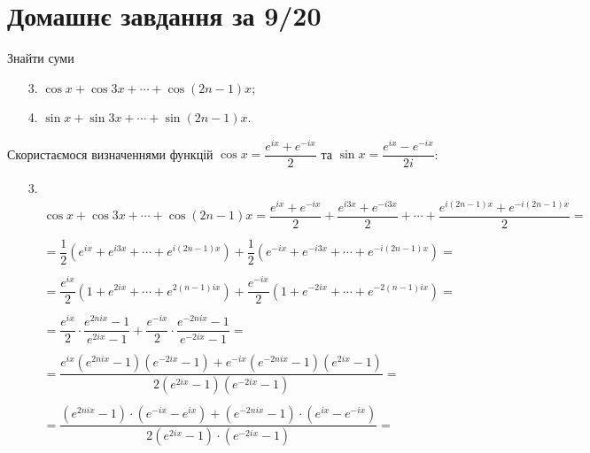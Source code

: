 \setcounter{section}{3}

\section{Домашнє завдання за 9/20}

\begin{problem}[Волковиський, 62]
    Знайти суми
    \begin{enumerate}
        \item[3.] $\cos x + \cos 3x + \cdots + \cos (2n - 1) x$;
        \item[4.] $\sin x + \sin 3x + \cdots + \sin (2n - 1) x$.
    \end{enumerate}
\end{problem}

\begin{solution}
    Скористаємося визначеннями функцій $\cos x = \dfrac{e^{ix} + e^{-ix}}{2}$ та $\sin x = \dfrac{e^{ix} - e^{-ix}}{2i}$:
    \begin{enumerate}
        \item[3.] 
        \begin{align*}
            & \cos x + \cos 3x + \cdots + \cos (2n - 1) x = \dfrac{e^{ix} + e^{-ix}}{2} + \dfrac{e^{i3x} + e^{-i3x}}{2} + \cdots + \dfrac{e^{i(2n-1)x} + e^{-i(2n-1)x}}{2} = \\
            \\
            &= \dfrac12 \left( e^{ix} + e^{i3x} + \cdots + e^{i(2n-1)x} \right) + \dfrac12 \left( e^{-ix} + e^{-i3x} + \cdots + e^{-i(2n-1)x} \right) = \\
            \\
            &= \dfrac{e^{ix}}2 \left( 1 + e^{2ix} + \cdots + e^{2(n-1)ix} \right) + \dfrac{e^{-ix}}2 \left( 1 + e^{-2ix} + \cdots + e^{-2(n-1)ix} \right) = \\
            \\
            &= \dfrac{e^{ix}}2 \cdot \dfrac{e^{2nix} - 1}{e^{2ix} - 1} + \dfrac{e^{-ix}}2 \cdot \dfrac{e^{-2nix} - 1}{e^{-2ix} - 1} = \\
            \\
            &= \dfrac{e^{ix}\left(e^{2nix} - 1\right)\left(e^{-2ix} - 1\right) + e^{-ix}\left(e^{-2nix} - 1\right)\left(e^{2ix} - 1\right)}{2(e^{2ix} - 1)(e^{-2ix} - 1)} = \\
            \\
            &= \dfrac{(e^{2nix} - 1)\cdot (e^{-ix} - e^{ix}) + (e^{-2nix} - 1)\cdot (e^{ix} - e^{-ix})}{2(e^{2ix} - 1)\cdot (e^{-2ix} - 1)} = \\

\end{align*}
\end{enumerate}
\end{solution}
